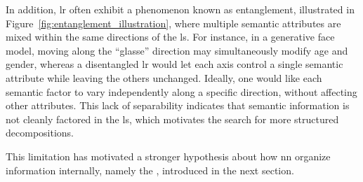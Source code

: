 In addition, \gls{lr} often exhibit a phenomenon known as entanglement, illustrated in Figure~\ref{fig:entanglement_illustration}, where multiple semantic attributes are mixed within the same directions of the \gls{ls}.
For instance, in a generative face model, moving along the ``glasse'' direction may simultaneously modify age and gender, whereas a disentangled \gls{lr} would let each axis control a single semantic attribute while leaving the others unchanged.
Ideally, one would like each semantic factor to vary independently along a specific direction, without affecting other attributes.
This lack of separability indicates that semantic information is not cleanly factored in the \gls{ls}, which motivates the search for more structured decompositions.



This limitation has motivated a stronger hypothesis about how \gls{nn} organize information internally, namely the \SuperpositionHypothesisName, introduced in the next section.
